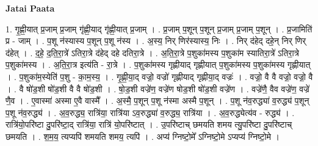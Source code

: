 \documentclass[17pt]{extarticle}
\begin{document}
\textbf{Jatai Paata} \newline

1. गृ॒ह्णी॒यात् प्र॒जाम् प्र॒जाम् गृ॑ह्णी॒याद् गृ॑ह्णी॒यात् प्र॒जाम् । . प्र॒जाम् प॒शून् प॒शून् प्र॒जाम् प्र॒जाम् प॒शून् । . प्र॒जामिति॑ प्र - जाम् । . प॒शू न॑स्यास्य प॒शून् प॒शू न॑स्य । . अ॒स्य॒ निर् णिर॑स्यास्य॒ निः । . निर् द॑हेद् दहे॒न् निर् णिर् द॑हेत् । . द॒हे॒ द॒ति॒रा॒त्रे॑ ऽतिरा॒त्रे द॑हेद् दहे दतिरा॒त्रे । . अ॒ति॒रा॒त्रे प॒शुका॑मस्य प॒शुका॑म स्यातिरा॒त्रे॑ ऽतिरा॒त्रे प॒शुका॑मस्य । . अ॒ति॒रा॒त्र इत्य॑ति - रा॒त्रे । . प॒शुका॑मस्य गृह्णीयाद् गृह्णीयात् प॒शुका॑मस्य प॒शुका॑मस्य गृह्णीयात् । . प॒शुका॑म॒स्येति॑ प॒शु - का॒म॒स्य॒ । . गृ॒ह्णी॒या॒द् वज्रो॒ वज्रो॑ गृह्णीयाद् गृह्णीया॒द् वज्रः॑ । . वज्रो॒ वै वै वज्रो॒ वज्रो॒ वै । . वै षो॑ड॒शी षो॑ड॒शी वै वै षो॑ड॒शी । . षो॒ड॒शी वज्रे॑ण॒ वज्रे॑ण षोड॒शी षो॑ड॒शी वज्रे॑ण । . वज्रे॑णै॒ वैव वज्रे॑ण॒ वज्रे॑ णै॒व । . ए॒वास्मा॑ अस्मा ए॒वै वास्मै᳚ । . अ॒स्मै॒ प॒शून् प॒शू न॑स्मा अस्मै प॒शून् । . प॒शू न॑व॒रुद्ध्या॑ व॒रुद्ध्य॑ प॒शून् प॒शू न॑व॒रुद्ध्य॑ । . अ॒व॒रुद्ध्य॒ रात्रि॑या॒ रात्रि॑या ऽव॒रुद्ध्या॑ व॒रुद्ध्य॒ रात्रि॑या । . अ॒व॒रुद्ध्येत्य॑व - रुद्ध्य॑ । . रात्रि॑यो॒परि॑ष्टा दु॒परि॑ष्टा॒द् रात्रि॑या॒ रात्रि॑ यो॒परि॑ष्टात् । . उ॒परि॑ष्टाच् छमयति शमय त्यु॒परि॑ष्टा दु॒परि॑ष्टाच् छमयति । . श॒म॒य॒ त्यप्यपि॑ शमयति शमय॒ त्यपि॑ । . अप्य॑ ग्निष्टो॒मे᳚ ऽग्निष्टो॒मे ऽप्यप्य॑ ग्निष्टो॒मे । \newline
\end{document}
